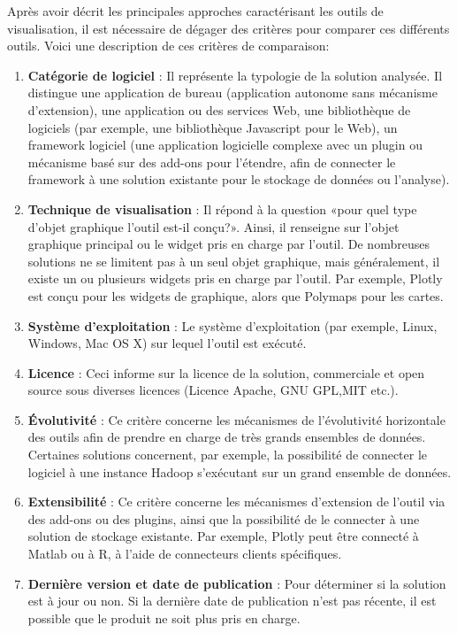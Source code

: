 \documentclass[french, a4paper, 12pt]{report}
\begin{document}
Après avoir décrit les principales approches caractérisant les outils de visualisation, il est nécessaire de dégager des critères pour comparer ces différents outils. Voici une description de ces critères de comparaison:
\begin{enumerate}
  \item \textbf {Catégorie de logiciel }: Il représente la typologie de la solution analysée. Il distingue une application de bureau (application autonome sans mécanisme d'extension), une application ou des services Web, une bibliothèque de logiciels (par exemple, une bibliothèque Javascript pour le Web), un framework logiciel (une application logicielle complexe avec un plugin ou mécanisme basé sur des add-ons pour l'étendre, afin de connecter le framework à une solution existante pour le stockage de données ou l'analyse). 
  \item \textbf {Technique de visualisation } : Il répond à la question «pour quel type d’objet graphique l’outil est-il conçu?». Ainsi, il renseigne sur l'objet graphique principal ou le widget pris en charge par l'outil. De nombreuses solutions ne se limitent pas à un seul objet graphique, mais généralement, il existe un ou plusieurs widgets pris en charge par l’outil. Par exemple, Plotly est conçu pour les widgets de graphique, alors que Polymaps pour les cartes.
  \item \textbf {Système d'exploitation} : Le système d'exploitation (par exemple, Linux, Windows, Mac OS X) sur lequel l'outil est exécuté.
  \item \textbf {Licence} : Ceci informe sur la licence de la solution, commerciale et open source sous diverses licences (Licence Apache, GNU GPL,MIT etc.).
  \item \textbf {Évolutivité } : Ce critère concerne les mécanismes de l’évolutivité horizontale des outils afin de prendre en charge de très grands ensembles de données. Certaines solutions concernent, par exemple, la possibilité de connecter le logiciel à une instance Hadoop s'exécutant sur un grand ensemble de données.
  \item \textbf {Extensibilité} : Ce critère concerne les mécanismes d'extension de l'outil via des add-ons ou des plugins, ainsi que la possibilité de le connecter à une solution de stockage existante. Par exemple, Plotly peut être connecté à Matlab ou à R, à l’aide de connecteurs clients spécifiques. 
  \item \textbf {Dernière version et date de publication} : Pour déterminer si la solution est à jour ou non. Si la dernière date de publication n'est pas récente, il est possible que le produit ne soit plus pris en charge.
\end{enumerate}
\end{document}

